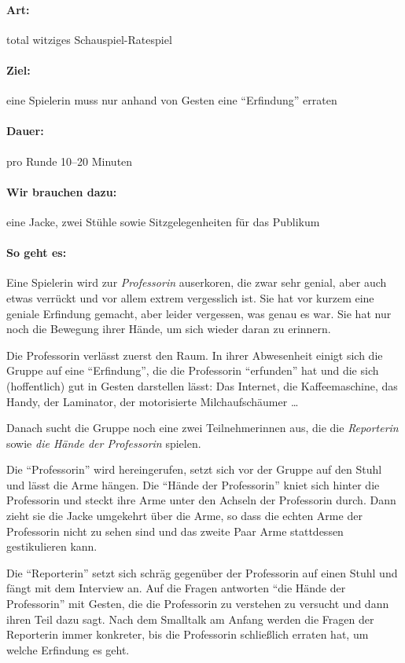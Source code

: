 \paragraph{Art:} total witziges Schauspiel-Ratespiel
\paragraph{Ziel:} eine Spielerin muss nur anhand von Gesten eine "`Erfindung"' erraten
\paragraph{Dauer:} pro Runde 10--20 Minuten
\paragraph{Wir brauchen dazu:} eine Jacke, zwei Stühle sowie Sitzgelegenheiten für das Publikum
\paragraph{So geht es:} Eine Spielerin wird zur \emph{Professorin} auserkoren, die zwar sehr genial, aber auch etwas verrückt und vor allem extrem vergesslich ist. Sie hat vor kurzem eine geniale Erfindung gemacht, aber leider vergessen, was genau es war. Sie hat nur noch die Bewegung ihrer Hände, um sich wieder daran zu erinnern.

Die Professorin verlässt zuerst den Raum. In ihrer Abwesenheit einigt sich die Gruppe auf eine "`Erfindung"', die die Professorin "`erfunden"' hat und die sich (hoffentlich) gut in Gesten darstellen lässt: Das Internet, die Kaffeemaschine, das Handy, der Laminator, der motorisierte Milchaufschäumer \ldots

Danach sucht die Gruppe noch eine zwei Teilnehmerinnen aus, die die \emph{Reporterin} sowie \emph{die Hände der Professorin} spielen.

Die "`Professorin"' wird hereingerufen, setzt sich vor der Gruppe auf den Stuhl und lässt die Arme hängen. Die "`Hände der Professorin"' kniet sich hinter die Professorin und steckt ihre Arme unter den Achseln der Professorin durch. Dann zieht sie die Jacke umgekehrt über die Arme, so dass die echten Arme der Professorin nicht zu sehen sind und das zweite Paar Arme stattdessen gestikulieren kann.

Die "`Reporterin"' setzt sich schräg gegenüber der Professorin auf einen Stuhl und fängt mit dem Interview an. Auf die Fragen antworten "`die Hände der Professorin"' mit Gesten, die die Professorin zu verstehen zu versucht und dann ihren Teil dazu sagt. Nach dem Smalltalk am Anfang werden die Fragen der Reporterin immer konkreter, bis die Professorin schließlich erraten hat, um welche Erfindung es geht.

